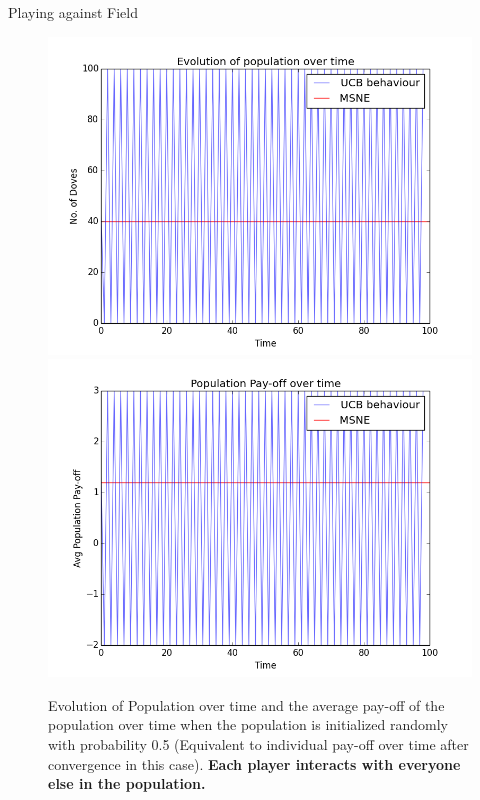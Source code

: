 \documentclass{IFES-beamer}
\begin{document}
        \begin{frame}{Playing against Field}
            \begin{figure}
                \centering
                \includegraphics[scale=0.25]{Images/UCB/Population/full_100_100_epochs.png}
                \includegraphics[scale=0.25]{Images/UCB/Pay-off/pay-off_full_100_100_epochs.png}
                \caption{Evolution of Population over time and the average pay-off of the population over time when the population is initialized randomly with probability 0.5 (Equivalent to individual pay-off over time after convergence in this case). \textbf{Each player interacts with everyone else in the population.}}
                \label{fig:my_label}
            \end{figure}
        \end{frame}
        
\end{document}
